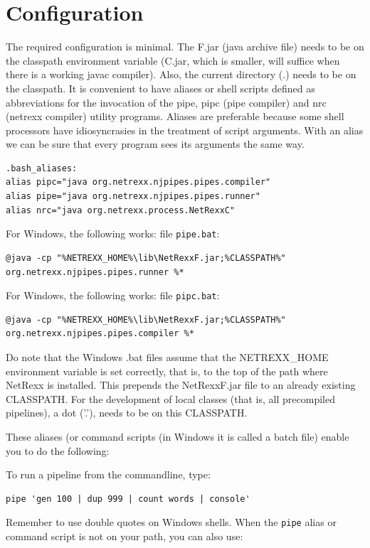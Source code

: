 \section{Configuration}
The required configuration is minimal. The \nr{}F.jar (java archive
file) needs to be on the classpath environment variable (\nr{}C.jar, which is smaller, will suffice when there is a working javac compiler). Also, the current directory (.) needs to be on the classpath.
It is convenient to have aliases or shell scripts defined as abbreviations for the invocation of the pipe, pipc (pipe compiler) and nrc (netrexx compiler) utility programs. 
Aliases are preferable because some shell processors have
idiosyncrasies in the treatment of script arguments. With an alias we
can be sure that every \nr{} program sees its arguments the same
way.
\begin{verbatim}
.bash_aliases:
alias pipc="java org.netrexx.njpipes.pipes.compiler"
alias pipe="java org.netrexx.njpipes.pipes.runner"
alias nrc="java org.netrexx.process.NetRexxC"
\end{verbatim}
For Windows, the following works: file \texttt{pipe.bat}:
\begin{verbatim}
@java -cp "%NETREXX_HOME%\lib\NetRexxF.jar;%CLASSPATH%" org.netrexx.njpipes.pipes.runner %*
\end{verbatim}
For Windows, the following works: file \texttt{pipc.bat}:
\begin{verbatim}
@java -cp "%NETREXX_HOME%\lib\NetRexxF.jar;%CLASSPATH%" org.netrexx.njpipes.pipes.compiler %*
\end{verbatim}

\begin{shaded}
Do note that the Windows .bat files assume that the NETREXX\_HOME
environment variable is set correctly, that is, to the top of the path
where NetRexx is installed. This prepends the NetRexxF.jar file to an
already existing CLASSPATH. For the development of local classes (that is, all precompiled pipelines), a
dot ('.'), needs to be on this CLASSPATH.
\end{shaded}
These aliases (or command scripts (in Windows it is called a batch
file) enable you to do the following:

To run a pipeline from the commandline, type:
\begin{lstlisting}
pipe 'gen 100 | dup 999 | count words | console'
\end{lstlisting}

Remember to use double quotes on Windows shells. When the \texttt{pipe}
alias or command script is not on your path, you can also use:

